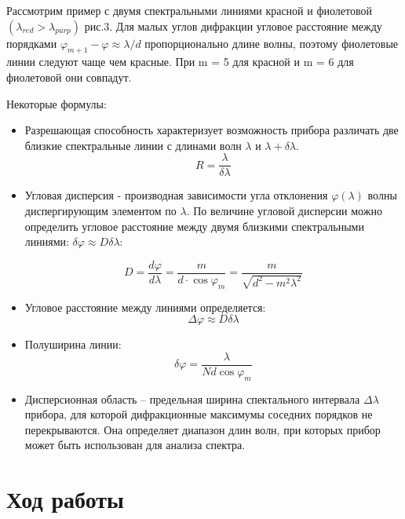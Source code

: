 \documentclass[a4paper,12pt]{article}
\theoremstyle{plain} %
\theoremstyle{definition} %
\theoremstyle{remark} %
\begin{document}
Рассмотрим пример с двумя спектральными линиями красной и фиолетовой $(\lambda_{red}> \lambda_{purp})$ рис.3. Для малых углов дифракции угловое расстояние между порядками $\varphi_{m+1} - \varphi \approx \lambda /d$ пропорционально длине волны, поэтому фиолетовые линии следуют чаще чем красные. При m = 5 для красной и m = 6 для фиолетовой они совпадут. \par 

Некоторые формулы:

\begin{itemize}
	\item Разрешающая способность характеризует возможность прибора различать две близкие спектральные линии с длинами волн $\lambda$ и $\lambda + \delta \lambda$.
	\begin{equation}
	R = \frac{\lambda}{\delta \lambda}
	\end{equation}
	
	\item Угловая дисперсия - производная зависимости угла отклонения $\varphi(\lambda)$ волны диспергирующим элементом по $\lambda$. По величине угловой дисперсии можно определить угловое расстояние между двумя близкими спектральными линиями: $\delta \varphi \approx D \delta \lambda$:
	
	\begin{equation}
	D = \frac{d \varphi}{d \lambda} = \frac{m}{d \cdot \cos{\varphi_m}} = \frac{m}{\sqrt{d^2 - m^2 \lambda^2}}
	\end{equation}
	
	\item Угловое расстояние между линиями определяется:
	\begin{equation}
	\Delta \varphi \approx D \delta \lambda
	\end{equation}
	
	\item Полуширина линии:
	\begin{equation}
	\delta \varphi = \frac{\lambda}{Nd \cos{\varphi_m}}
	\end{equation}
	
	\item Дисперсионная область – предельная ширина спектального интервала $\Delta \lambda$ прибора, для которой дифракционные максимумы соседних порядков не перекрываются. Она определяет диапазон длин волн, при которых прибор может быть использован для анализа спектра.
	
\end{itemize}


\section{Ход работы}
\end{document}
